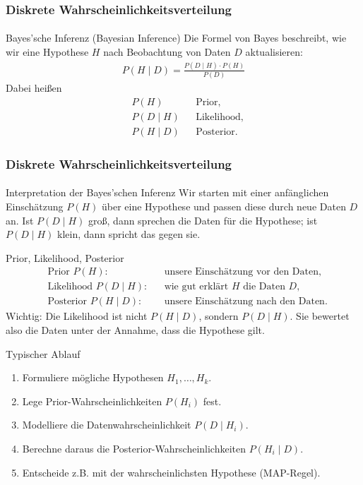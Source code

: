 \documentclass{beamer}
\begin{document}
\begin{frame}
    \frametitle{Diskrete Wahrscheinlichkeitsverteilung}
\framesubtitle{}

\begin{block}{Bayes'sche Inferenz (Bayesian Inference)}
Die Formel von Bayes beschreibt, wie wir eine Hypothese $H$ nach Beobachtung von Daten $D$ aktualisieren:
\begin{align*}
P(H \mid D) = \frac{P(D \mid H) \cdot P(H)}{P(D)}
\end{align*}
Dabei heißen
\begin{align*}
&P(H) &&\text{Prior}, \\
&P(D \mid H) &&\text{Likelihood}, \\
&P(H \mid D) &&\text{Posterior}.
\end{align*}
\end{block}

 \end{frame}


\begin{frame}[shrink=5]
    \frametitle{Diskrete Wahrscheinlichkeitsverteilung}
\framesubtitle{}

\begin{block}{Interpretation der Bayes'schen Inferenz}
Wir starten mit einer anfänglichen Einschätzung $P(H)$ über eine Hypothese und passen diese durch neue Daten $D$ an.
Ist $P(D \mid H)$ groß, dann sprechen die Daten für die Hypothese; ist $P(D \mid H)$ klein, dann spricht das gegen sie.
\end{block}

\begin{block}{Prior, Likelihood, Posterior}
\begin{align*}
&\text{Prior } P(H): &&\text{unsere Einschätzung vor den Daten}, \\
&\text{Likelihood } P(D \mid H): &&\text{wie gut erklärt } H \text{ die Daten } D, \\
&\text{Posterior } P(H \mid D): &&\text{unsere Einschätzung nach den Daten}.
\end{align*}
Wichtig: Die Likelihood ist nicht $P(H \mid D)$, sondern $P(D \mid H)$. Sie bewertet also die Daten unter der Annahme, dass die Hypothese gilt.
\end{block}

\begin{block}{Typischer Ablauf}
\begin{enumerate}
\item Formuliere mögliche Hypothesen $H_1,\ldots,H_k$.
\item Lege Prior-Wahrscheinlichkeiten $P(H_i)$ fest.
\item Modelliere die Datenwahrscheinlichkeit $P(D \mid H_i)$.
\item Berechne daraus die Posterior-Wahrscheinlichkeiten $P(H_i \mid D)$.
\item Entscheide z.B. mit der wahrscheinlichsten Hypothese (MAP-Regel).
\end{enumerate}
\end{block}

 \end{frame}
\end{document}
